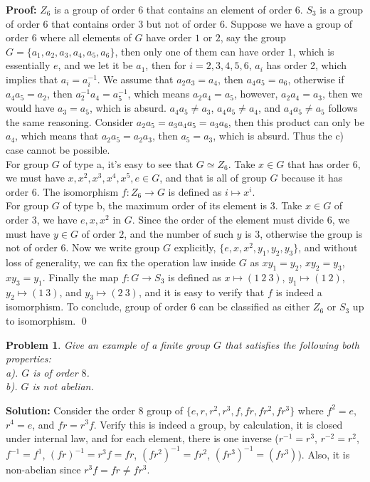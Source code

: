 \documentclass[12pt]{article}
\newtheorem{problem}{Problem}
\begin{document}
\textbf{Proof:} $Z_{6}$ is a group of order $6$ that contains an element of order $6$. $S_{3}$ is a group of order $6$ that contains order $3$ but not of order $6$. Suppose we have a group of order $6$ where all elements of $G$ have order $1$ or $2$, say the group $G = \{a_{1}, a_{2}, a_{3}, a_{4}, a_{5}, a_{6}\}$, then only one of them can have order $1$, which is essentially $e$, and we let it be $a_{1}$, then for $i=2, 3, 4, 5, 6$, $a_{i}$ has order 2, which implies that $a_{i} = a_{i}^{-1}$. We assume that $a_{2}a_{3} = a_{4}$, then $a_{4}a_{5}=a_{6}$, otherwise if $a_{4}a_{5} = a_{2}$, then $a_{2}^{-1}a_{4} = a_{5}^{-1}$, which means $a_{2}a_{4}=a_{5}$, however, $a_{2}a_{4} = a_{3}$, then we would have $a_{3} = a_{5}$, which is absurd. $a_{4}a_{5}\neq a_{3}$, $a_{4}a_{5}\neq a_{4}$, and $a_{4}a_{5}\neq a_{5}$ follows the same reasoning. Consider $a_{2}a_{5}=a_{3}a_{4}a_{5}=a_{3}a_{6}$, then this product can only be $a_{4}$, which means that $a_{2}a_{5}=a_{2}a_{3}$, then $a_{5}=a_{3}$, which is absurd. Thus the c) case cannot be possible. \\
\indent For group $G$ of type a, it's easy to see that $G\simeq Z_6$. Take $x\in G$ that has order $6$, we must have $x,x^2,x^3, x^4,x^5,e\in G$, and that is all of group $G$ because it has order $6$. The isomorphism $f: Z_{6}\to G$ is defined as $i\mapsto x^i$. \\
\indent For group $G$ of type b, the maximum order of its element is $3$. Take $x\in G$ of order $3$, we have $e, x, x^2$ in $G$. Since the order of the element must divide $6$, we must have $y\in G$ of order $2$, and the number of such $y$ is $3$, otherwise the group is not of order $6$. Now we write group $G$ explicitly, $\{e, x, x^2, y_1, y_2, y_3\}$, and without loss of generality, we can fix the operation law inside $G$ as $xy_1=y_2$, $xy_2=y_3$, $xy_3=y_1$. Finally the map $f:G\to S_3$ is defined as $x\mapsto(1\ 2\ 3)$, $y_1\mapsto (1\ 2)$, $y_2\mapsto (1\ 3)$, and $y_3\mapsto (2\ 3)$, and it is easy to verify that $f$ is indeed a isomorphism. To conclude, group of order $6$ can be classified as either $Z_6$ or $S_3$ up to isomorphism. \qed
\\
\begin{problem}
Give an example of a finite group $G$ that satisfies the following both properties: \\
\indent a). $G$ is of order $8$. \\
\indent b). $G$ is not abelian.
\end{problem}

\textbf{Solution:} Consider the order 8 group of $\{e, r, r^2, r^3, f, fr, fr^2, fr^3\}$ where $f^2 = e$, $r^4 = e$, and $fr = r^3f$. Verify this is indeed a group, by calculation, it is closed under internal law, and for each element, there is one inverse ($r^{-1} = r^3$, $r^{-2} = r^{2}$, $f^{-1} = f^{1}$, $(fr)^{-1} = r^{3}f= fr$, $(fr^{2})^{-1} = fr^2$, $(fr^{3})^{-1} = (fr^3)$). Also, it is non-abelian since $r^3f = fr\neq fr^3$.
\end{document}
